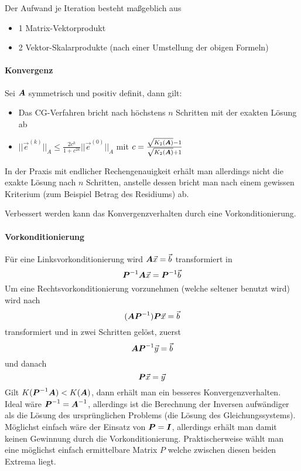 Der Aufwand je Iteration besteht maßgeblich aus
\begin{itemize}
	\item 1 Matrix-Vektorprodukt
	\item 2 Vektor-Skalarprodukte (nach einer Umstellung der obigen Formeln)
\end{itemize}

\paragraph{Konvergenz} Sei $\boldsymbol {A}$ symmetrisch und positiv definit, dann gilt:
\begin{itemize}
	\item Das CG-Verfahren bricht nach höchstens $n$ Schritten mit der exakten Lösung ab
	\item $||\vec{e}^{(k)}||_A \le \frac{2 c^k}{1 + c^{2k}} ||\vec{e}^{(0)}||_A$ mit $c = \frac{\sqrt{K_2(\boldsymbol {A})} - 1}{\sqrt{K_2(\boldsymbol {A})} + 1}$
\end{itemize}
In der Praxis mit endlicher Rechengenauigkeit erhält man allerdings nicht die exakte Lösung nach $n$ Schritten, anstelle dessen bricht man nach einem gewissen Kriterium (zum Beispiel Betrag des Residiums) ab.

Verbessert werden kann das Konvergenzverhalten durch eine Vorkonditionierung.

\paragraph{Vorkonditionierung} Für eine Linksvorkonditionierung wird $\boldsymbol {A} \vec{x} = \vec{b}$ transformiert in
\begin{equation}
	\boldsymbol {P}^{-1} \boldsymbol {A} \vec{x} = \boldsymbol {P}^{-1} \vec{b}
\end{equation}
Um eine Rechtsvorkonditionierung vorzunehmen (welche seltener benutzt wird) wird nach
\begin{equation}
	(\boldsymbol {A} \boldsymbol {P}^{-1}) \boldsymbol {P} \vec{x} = \vec{b}
\end{equation}
transformiert und in zwei Schritten gelöst, zuerst
\begin{equation}
	\boldsymbol {A} \boldsymbol {P}^{-1} \vec{y} = \vec{b}
\end{equation}
und danach
\begin{equation}
	\boldsymbol {P} \vec{x} = \vec{y}
\end{equation}
Gilt $K(\boldsymbol {P}^{-1} \boldsymbol {A}) < K(\boldsymbol {A})$, dann erhält man ein besseres Konvergenzverhalten. Ideal wäre $\boldsymbol {P}^{-1} = \boldsymbol {A}^{-1}$, allerdings ist die Berechnung der Inversen aufwändiger als die Lösung des ursprünglichen Problems (die Lösung des Gleichungssystems). Möglichst einfach wäre der Einsatz von $\boldsymbol {P} = \boldsymbol {I}$, allerdings erhält man damit keinen Gewinnung durch die Vorkonditionierung. Praktischerweise wählt man eine möglichst einfach ermittelbare Matrix $P$ welche zwischen diesen beiden Extrema liegt.

